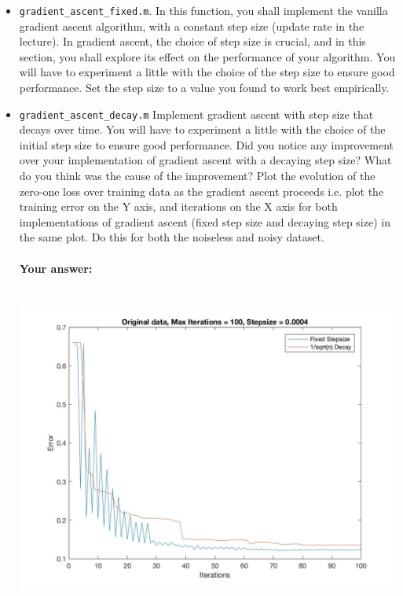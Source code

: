 \documentclass[english]{article}
\begin{document}
\begin{itemize}
\item {\tt gradient\_ascent\_fixed.m}. In this function, you shall implement the vanilla gradient ascent algorithm, with a constant step size (update rate in the lecture). In gradient ascent, the choice of step size is crucial, and in this section, you shall explore its effect on the performance of your algorithm. You will have to experiment a little with the choice of the step size to ensure good performance. Set the step size to a value you found to work best empirically. 

\item {\tt gradient\_ascent\_decay.m} Implement gradient ascent with step size that decays over time. You will have to experiment a little with the choice of the initial step size to ensure good performance. Did you notice any improvement over your implementation of gradient ascent with a decaying step size? What do you think was the cause of the improvement? Plot the evolution of the zero-one loss over training data as the gradient ascent proceeds i.e. plot the training error on the Y axis, and iterations on the X axis for both implementations of gradient ascent (fixed step size and decaying step size) in the same plot. Do this for both the noiseless and noisy dataset.

\paragraph{Your answer:}
 ~\\
 
 {\tt  \includegraphics[width=1\textwidth]{original_decayornot.jpg}}
 \\    
 

\end{itemize}
\end{document}
